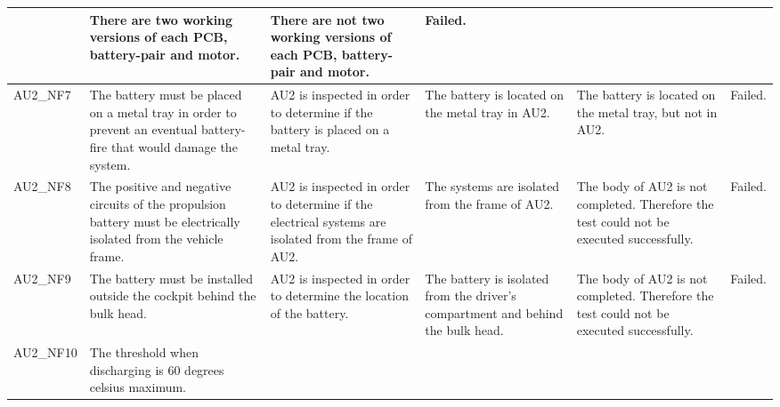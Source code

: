 \begin{longtable}{|p{1.7 cm}|p{2.9 cm}|p{2.9 cm}|p{1.9 cm}|p{1.8 cm}|p{1.8 cm}|}
	& There are two working versions of each PCB, battery-pair and motor.
	& There are not two working versions of each PCB, battery-pair and motor.
	& Failed.\\ \hline
	AU2\_NF7	& The battery must be placed on a metal tray in order to prevent an eventual battery-fire that would damage the system.
	& AU2 is inspected in order to determine if the battery is placed on a metal tray.
	& The battery is located on the metal tray in AU2.
	& The battery is located on the metal tray, but not in AU2. 
	& Failed.\\ \hline
	AU2\_NF8 
	& The positive and negative circuits of the propulsion battery must be electrically isolated from the vehicle frame.
	& AU2 is inspected in order to determine if the electrical systems are isolated from the frame of AU2.
	& The systems are isolated from the frame of AU2.
	& The body of AU2 is not completed. Therefore the test could not be executed successfully.
	& Failed.\\ \hline
	AU2\_NF9 
	& The battery must be installed outside the cockpit behind the bulk head.
	& AU2 is inspected in order to determine the location of the battery.
	& The battery is isolated from the driver's compartment and behind the bulk head. 
	& The body of AU2 is not completed. Therefore the test could not be executed successfully.
	& Failed.\\ \hline
	AU2\_NF10
	& The threshold when discharging is 60 degrees celsius maximum. 
	& 
	& \\ \hline
\end{longtable}